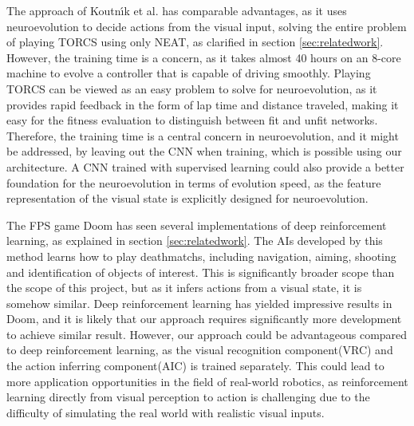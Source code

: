 The approach of Koutn\'{\i}k et al.\cite{torcs} has comparable advantages, as it uses neuroevolution to decide actions from the visual input, solving the entire problem of playing TORCS using only NEAT, as clarified in section \ref{sec:relatedwork}. However, the training time is a concern, as it takes almost 40 hours on an 8-core machine to evolve a controller that is capable of driving smoothly. Playing TORCS can be viewed as an easy problem to solve for neuroevolution, as it provides rapid feedback in the form of lap time and distance traveled, making it easy for the fitness evaluation to distinguish between fit and unfit networks. Therefore, the training time is a central concern in neuroevolution, and it might be addressed, by leaving out the CNN when training, which is possible using our architecture. A CNN trained with supervised learning could also provide a better foundation for the neuroevolution in terms of evolution speed, as the feature representation of the visual state is explicitly designed for neuroevolution.

The FPS game Doom has seen several implementations of deep reinforcement learning, as explained in section \ref{sec:relatedwork}. The AIs developed by this method learns how to play deathmatchs, including navigation, aiming, shooting and identification of objects of interest. This is significantly broader scope than the scope of this project, but as it infers actions from a visual state, it is somehow similar. Deep reinforcement learning has yielded impressive results in Doom, and it is likely that our approach requires significantly more development to achieve similar result. However, our approach could be advantageous compared to deep reinforcement learning, as the visual recognition component(VRC) and the action inferring component(AIC) is trained separately. This could lead to more application opportunities in the field of real-world robotics, as reinforcement learning directly from visual perception to action is challenging due to the difficulty of simulating the real world with realistic visual inputs.

